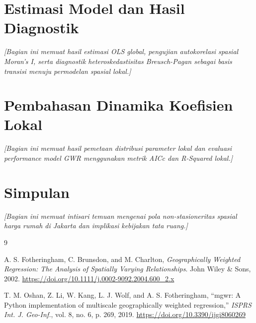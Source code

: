 \documentclass[10pt,journal]{IEEEtran}
\begin{document}
\section{Estimasi Model dan Hasil Diagnostik}
\textit{[Bagian ini memuat hasil estimasi OLS global, pengujian autokorelasi spasial Moran's I, serta diagnostik heteroskedastisitas Breusch-Pagan sebagai basis transisi menuju permodelan spasial lokal.]}

\section{Pembahasan Dinamika Koefisien Lokal}
\textit{[Bagian ini memuat hasil pemetaan distribusi parameter lokal dan evaluasi performance model GWR menggunakan metrik AICc dan R-Squared lokal.]}

\section{Simpulan}
\textit{[Bagian ini memuat intisari temuan mengenai pola non-stasioneritas spasial harga rumah di Jakarta dan implikasi kebijakan tata ruang.]}


\begin{thebibliography}{9}

A. S. Fotheringham, C. Brunsdon, and M. Charlton, \textit{Geographically Weighted Regression: The Analysis of Spatially Varying Relationships}. John Wiley \& Sons, 2002. \url{https://doi.org/10.1111/j.0002-9092.2004.600_2.x}

T. M. Oshan, Z. Li, W. Kang, L. J. Wolf, and A. S. Fotheringham, ``mgwr: A Python implementation of multiscale geographically weighted regression,'' \textit{ISPRS Int. J. Geo-Inf.}, vol. 8, no. 6, p. 269, 2019. \url{https://doi.org/10.3390/ijgi8060269}

\end{thebibliography}
\end{document}
